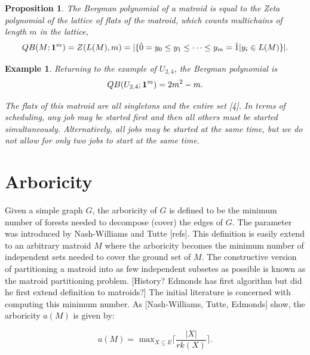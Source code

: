 \documentclass[12pt,reqno]{amsart}
\numberwithin{definition}{section}
\newtheorem{proposition}[definition]{Proposition}
\newtheorem{example}[definition]{Example}
\begin{document}
\begin{proposition}
The Bergman polynomial of a matroid is equal to the Zeta polynomial of the lattice of flats of the matroid, which counts multichains of length $m$ in the lattice,
$$QB(M;{\bf 1}^m) = Z(L(M),m) = |\{ \hat{0} = y_0 \leq y_1 \leq \cdots \leq y_m = \hat{1} | y_i \in L(M) \}|.$$

\end{proposition}



\begin{example}
Returning to the example of $U_{2,4}$, the Bergman polynomial is
$$QB(U_{2,4};{\bf 1}^m) = 2m^2 - m.$$

The flats of this matroid are all singletons and the entire set [4].  In terms of scheduling, any job may be started first and then all others must be started simultaneously.  Alternatively, all jobs may be started at the same time, but we do not allow for only two jobs to start at the same time. 
\end{example}



\section{Arboricity}



Given a simple graph $G$, the arboricity of $G$ is defined to be the
minimum number of forests needed to decompose (cover) the edges of
$G$.  The parameter was introduced by Nash-Williams and Tutte [refs].
This definition is easily extend to an arbitrary matroid $M$ where the
arboricity becomes the minimum number of independent sets needed to
cover the ground set of $M$.  The constructive version of partitioning
a matroid into as few independent subsetes as possible is known as the
matroid partitioning problem. [History?  Edmonds has first algorithm
  but did he first extend definition to matroids?]  The initial
literature is concerned with computing this minimum number.  As
[Nash-Williams, Tutte, Edmonds] show, the arboricity $a(M)$ is given
by:

$$ a(M) = \textrm{ max}_{X\subseteq E} \lceil { \frac{|X|}{rk(X)}} \rceil . $$
\end{document}
